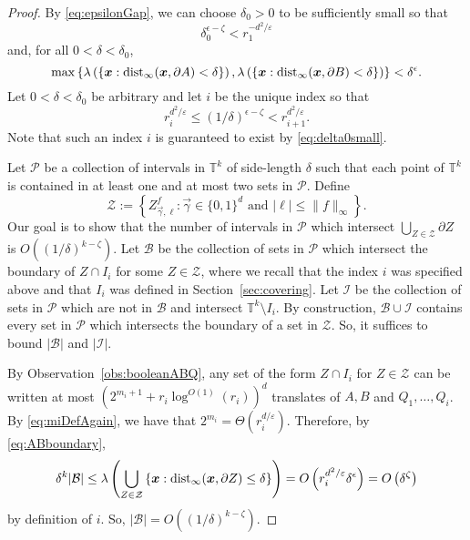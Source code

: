 \documentclass[12pt,a4paper]{amsart}
\numberwithin{equation}{section}
\theoremstyle{definition}
\begin{document}
\begin{proof}
By \eqref{eq:epsilonGap}, we can choose $\delta_0>0$ to be sufficiently small so that 
\begin{equation}
\label{eq:delta0small}
\delta_0^{\epsilon-\zeta}<r_1^{-d^2/\varepsilon}
\end{equation} 
and, for all $0 < \delta < \delta_0$,
\begin{equation}\label{eq:ABboundary}\max\left\{\lambda\left(\left\{\boldsymbol{x}: \operatorname{dist}_\infty(\boldsymbol{x},\partial A)<\delta\right\}\right),\lambda\left(\left\{\boldsymbol{x}: \operatorname{dist}_\infty(\boldsymbol{x},\partial B)<\delta\right\}\right)\right\}< \delta^{\epsilon}.\end{equation}
Let $0<\delta<\delta_0$ be arbitrary and let $i$ be the unique index so that
\begin{equation}\label{eq:riChoice}r_i^{d^2/\varepsilon}\leq \left(1/\delta\right)^{\epsilon-\zeta} < r_{i+1}^{d^2/\varepsilon}.\end{equation}
Note that such an index $i$ is guaranteed to exist by \eqref{eq:delta0small}.

Let $\mathcal{P}$ be a collection of intervals in $\mathbb{T}^k$ of side-length $\delta$ such that each point of $\mathbb{T}^k$ is contained in at least one and at most two sets in $\mathcal{P}$. Define
\[\mathcal{Z}:=\left\{Z_{\vec{\gamma},\ell}^f: \vec{\gamma}\in\{0,1\}^d\text{ and }|\ell|\leq \|f\|_\infty\right\}.\]
Our goal is to show that the number of intervals in $\mathcal{P}$ which intersect $\bigcup_{Z\in\mathcal{Z}}\partial Z$ is $O\left(\left(1/\delta\right)^{k-\zeta}\right)$. Let $\mathcal{B}$ be the collection of sets in $\mathcal{P}$ which intersect the boundary of $Z\cap I_i$ for some $Z\in \mathcal{Z}$, where we recall that the index $i$ was specified above and that $I_i$ was defined in Section~\ref{sec:covering}. Let $\mathcal{I}$ be the collection of sets in $\mathcal{P}$ which are not in $\mathcal{B}$ and intersect $\mathbb{T}^k\setminus I_i$. By construction, $\mathcal{B}\cup \mathcal{I}$ contains every set in $\mathcal{P}$ which intersects the boundary of a set in $\mathcal{Z}$. So, it suffices to bound $|\mathcal{B}|$ and $|\mathcal{I}|$. 

By Observation~\ref{obs:booleanABQ}, any set of the form $Z\cap I_i$ for $Z\in\mathcal{Z}$ can be written at most $\left(2^{m_i+1} + r_i\log^{O(1)}(r_i)\right)^d$ translates of $A,B$ and $Q_1,\dots,Q_i$.  By \eqref{eq:miDefAgain}, we have that $2^{m_i}=\Theta(r_i^{d/\varepsilon})$. Therefore, by \eqref{eq:ABboundary},
\[\delta^k|\mathcal{B}|\leq \lambda\left(\bigcup_{Z\in\mathcal{Z}}\left\{\boldsymbol{x}: \operatorname{dist}_\infty(\boldsymbol{x},\partial Z)\leq \delta\right\}\right)=O\left(r_i^{d^2/\varepsilon}\delta^{\epsilon}\right)=O\left(\delta^{\zeta}\right)\]
by definition of $i$. So, $|\mathcal{B}|=O\left( (1/\delta)^{k-\zeta}\right)$. 


\end{proof}
\end{document}
